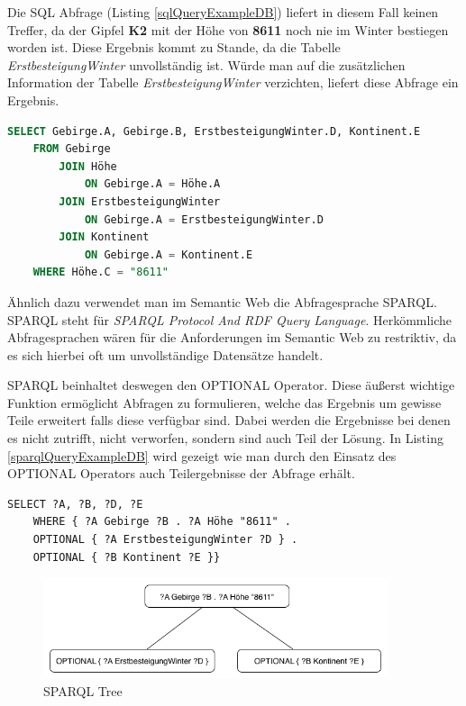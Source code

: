 \documentclass[draft,final]{vutinfth} %
\begin{document}
Die SQL Abfrage (Listing \ref{sqlQueryExampleDB}) liefert in diesem Fall keinen Treffer, da der Gipfel \textbf{K2} mit der Höhe von \textbf{8611} noch nie im Winter bestiegen worden ist. Diese Ergebnis kommt zu Stande, da die Tabelle \textit{ErstbesteigungWinter} unvollständig ist. Würde man auf die zusätzlichen Information der Tabelle \textit{ErstbesteigungWinter} verzichten, liefert diese Abfrage ein Ergebnis.

\begin{lstlisting}[language=SQL,caption={SELECT DB Beispiel},frame = single,label={sqlQueryExampleDB}]
SELECT Gebirge.A, Gebirge.B, ErstbesteigungWinter.D, Kontinent.E
	FROM Gebirge 
		JOIN Höhe
			ON Gebirge.A = Höhe.A
		JOIN ErstbesteigungWinter 
			ON Gebirge.A = ErstbesteigungWinter.D
		JOIN Kontinent
			ON Gebirge.A = Kontinent.E
	WHERE Höhe.C = "8611"
\end{lstlisting}
 
Ähnlich dazu verwendet man im Semantic Web die Abfragesprache SPARQL. SPARQL steht für \textit{SPARQL Protocol And RDF Query Language}. Herkömmliche Abfragesprachen wären für die Anforderungen im Semantic Web zu restriktiv, da es sich hierbei oft um unvollständige Datensätze handelt.

SPARQL beinhaltet deswegen den OPTIONAL Operator. Diese äu{\ss}erst wichtige Funktion ermöglicht Abfragen zu formulieren, welche das Ergebnis um gewisse Teile erweitert falls diese verfügbar sind. Dabei werden die Ergebnisse bei denen es nicht zutrifft, nicht verworfen, sondern sind auch Teil der Lösung. In Listing \ref{sparqlQueryExampleDB} wird gezeigt wie man durch den Einsatz des OPTIONAL Operators auch Teilergebnisse der Abfrage erhält.

\begin{lstlisting}[language=Sparql,caption={SPARQL DB Beispiel},frame = single,label={sparqlQueryExampleDB}]
SELECT ?A, ?B, ?D, ?E
	WHERE { ?A Gebirge ?B . ?A Höhe "8611" . 
	OPTIONAL { ?A ErstbesteigungWinter ?D } .
	OPTIONAL { ?B Kontinent ?E }}
\end{lstlisting}

\begin{figure}[ht]
	\centering
	\includegraphics[width=0.9\textwidth]{SPARQL}
	\caption{SPARQL Tree}
	\label{sparqlTree}
\end{figure}
\end{document}
